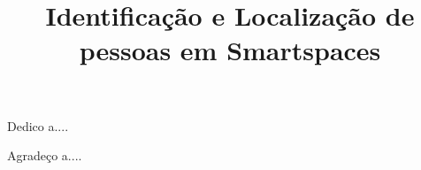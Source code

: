 \documentclass[bacharelado]{unb-cic}
\title{Identificação e Localização de pessoas em Smartspaces}
\begin{document}
\maketitle
\pretextual
\begin{dedicatoria}
	Dedico a....
\end{dedicatoria}

\begin{agradecimentos}
	Agradeço a....
\end{agradecimentos}







\tableofcontents
\listoffigures
\listoftables

\textual





% 



\postextual






\end{document}
